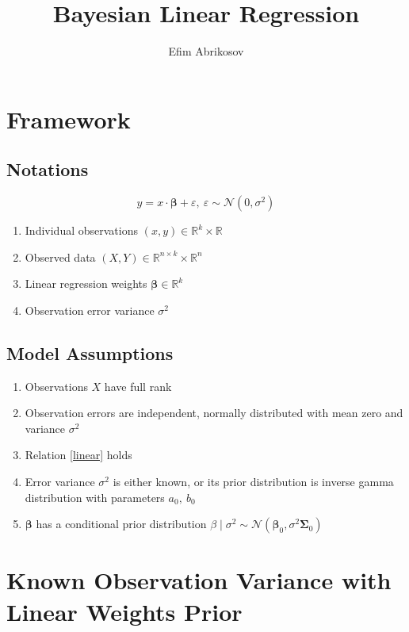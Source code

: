 \documentclass[12pt]{article}
\theoremstyle{definition}
\theoremstyle{remark}
\numberwithin{equation}{section}
\newcommand{\RR}{\mathbb{R}}
\newcommand{\bbeta}{\boldsymbol{\beta}}
\newcommand{\SSigma}{\boldsymbol{\Sigma}}
\begin{document}
\title{Bayesian Linear Regression}
\author{Efim Abrikosov}
\maketitle

\section{Framework}
\subsection{Notations}

\begin{equation}\label{linear}
    y = x\cdot \bbeta +\varepsilon,\ \varepsilon \sim\mathcal{N}(0,\sigma^2)
\end{equation}

\begin{enumerate}
    \item Individual observations $(x, y) \in \RR^k\times \RR$
    \item Observed data $(X, Y)\in \RR^{n\times k}\times \RR^n$
    \item Linear regression weights $\bbeta \in \RR^k$ 
    \item Observation error variance $\sigma^2$
\end{enumerate}

\subsection{Model Assumptions}
\begin{enumerate}
    \item Observations $X$ have full rank
    \item Observation errors are independent, normally distributed with
    mean zero and variance $\sigma^2$
    \item Relation \ref{linear} holds
    \item Error variance $\sigma^2$ is either known, or its prior distribution
    is inverse gamma distribution with parameters $a_0,\ b_0$
    \item $\bbeta$ has a conditional prior distribution
    $\beta\mid\sigma^2\sim\mathcal{N}(\bbeta_0,\sigma^2\SSigma_0)$
\end{enumerate}

\section{Known Observation Variance with Linear Weights Prior}
\end{document}
